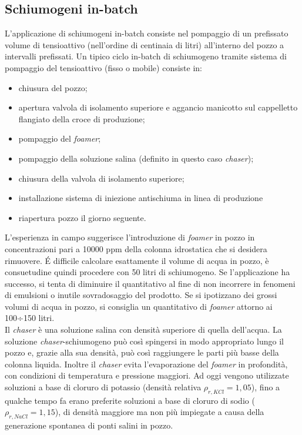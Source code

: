 \subsection{Schiumogeni in-batch}
L'applicazione di schiumogeni in-batch consiste nel pompaggio di un prefissato volume di tensioattivo (nell'ordine di centinaia di litri) all'interno del pozzo a intervalli prefissati. Un tipico ciclo in-batch di schiumogeno tramite sistema di pompaggio del tensioattivo (fisso o mobile) consiste in:
\begin{itemize}
    \item chiusura del pozzo;
    \item apertura valvola di isolamento superiore e aggancio manicotto sul cappelletto flangiato della croce di produzione;
    \item pompaggio del \textit{foamer};
    \item pompaggio della soluzione salina (definito in questo caso \textit{chaser});
    \item chiusura della valvola di isolamento superiore;
    \item installazione sistema di iniezione antischiuma in linea di produzione
    \item riapertura pozzo il giorno seguente.
\end{itemize}
L'esperienza in campo suggerisce l'introduzione di \textit{foamer} in pozzo in concentrazioni pari a 10000 ppm della colonna idrostatica che si desidera rimuovere. \'E difficile calcolare esattamente il volume di acqua in pozzo, è consuetudine quindi procedere con 50 litri di schiumogeno. Se l'applicazione ha successo, si tenta di diminuire il quantitativo al fine di non incorrere in fenomeni di emulsioni o inutile sovradosaggio del prodotto. Se si ipotizzano dei grossi volumi di acqua in pozzo, si consiglia un quantitativo di \textit{foamer} attorno ai 100÷150 litri.\\
Il \textit{chaser} è una soluzione salina con densità superiore di quella dell'acqua. La soluzione \textit{chaser}-schiumogeno può così spingersi in modo appropriato lungo il pozzo e, grazie alla sua densità, può così raggiungere le parti più basse della colonna liquida. Inoltre il \textit{chaser} evita l'evaporazione del \textit{foamer} in profondità, con condizioni di temperatura e pressione maggiori. Ad oggi vengono utilizzate soluzioni a base di cloruro di potassio (densità relativa \(\rho_{r,KCl}=1,05\)), fino a qualche tempo fa erano preferite soluzioni a base di cloruro di sodio (\(\rho_{r,NaCl}=1,15\)), di densità maggiore ma non più impiegate a causa della generazione spontanea di ponti salini in pozzo.\\

